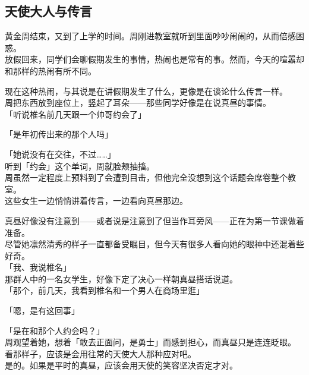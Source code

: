 \subsection{天使大人与传言}

黄金周结束，又到了上学的时间。周刚进教室就听到里面吵吵闹闹的，从而倍感困惑。\\

放假回来，同学们会聊假期发生的事情，热闹也是常有的事。然而，今天的喧嚣却和那样的热闹有所不同。

现在这种热闹，与其说是在讲假期发生了什么，更像是在谈论什么传言一样。\\

周把东西放到座位上，竖起了耳朵——那些同学好像是在说真昼的事情。\\

「听说椎名前几天跟一个帅哥约会了」

「是年初传出来的那个人吗」

「她说没有在交往，不过……」\\

听到「约会」这个单词，周就脸颊抽搐。\\

周虽然一定程度上预料到了会遭到目击，但他完全没想到这个话题会席卷整个教室。\\

这些女生一边悄悄讲着传言，一边看向真昼那边。

真昼好像没有注意到——或者说是注意到了但当作耳旁风——正在为第一节课做着准备。\\

尽管她凛然清秀的样子一直都备受瞩目，但今天有很多人看向她的眼神中还混着些好奇。\\

「我、我说椎名」\\

那群人中的一名女学生，好像下定了决心一样朝真昼搭话说道。\\

「那个，前几天，我看到椎名和一个男人在商场里逛」

「嗯，是有这回事」

「是在和那个人约会吗？」\\

周观望着她，想着「敢去正面问，是勇士」而感到担心，而真昼只是连连眨眼。\\

看那样子，应该是会用往常的天使大人那种应对吧。\\

是的。如果是平时的真昼，应该会用天使的笑容坚决否定才对。\\

